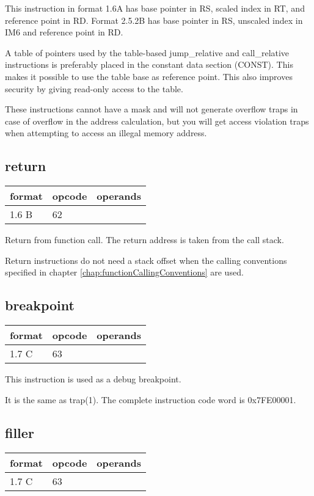 \documentclass[forwardcom.tex]{subfiles}
\begin{document}
This instruction in format 1.6A has base pointer in RS, scaled index in RT, and reference point in RD. Format 2.5.2B has base pointer in RS, unscaled index in IM6 and reference point in RD.
\vv

A table of pointers used by the table-based jump\_relative and call\_relative instructions is preferably placed in the constant data section (CONST). This makes it possible to use the table base as reference point. This also improves security by giving read-only access to the table.
\vv

These instructions cannot have a mask and will not generate overflow traps in case of overflow in the address calculation, but you will get access violation traps when attempting to access an illegal memory address.
\vv


\subsection{return}
\label{table:returnInstruction}
\begin{tabular}{|p{14mm}|p{12mm}|p{110mm}|}
\hline
\bfseries format & \bfseries opcode & \bfseries operands \\ \hline
1.6 B & 62 & \\ \hline
\end{tabular}
\vv

Return from function call. The return address is taken from the call stack.
\vv

Return instructions do not need a stack offset when the calling conventions specified in chapter \ref{chap:functionCallingConventions} are used.


\subsection{breakpoint}
\label{table:breakpointInstruction}
\begin{tabular}{|p{12mm}|p{12mm}|p{110mm}|}
\hline
\bfseries format & \bfseries opcode & \bfseries operands \\ \hline
1.7 C & 63 & \\ \hline
\end{tabular}
\vv

This instruction is used as a debug breakpoint.
\vv

It is the same as trap(1). The complete instruction code word is 0x7FE00001.
\vv

\subsection{filler}
\label{table:fillerInstruction}
\begin{tabular}{|p{12mm}|p{15mm}|p{100mm}|}
\hline
\bfseries format & \bfseries opcode & \bfseries operands \\ \hline
1.7 C & 63 & \\ \hline
\end{tabular}
\vv
\end{document}
